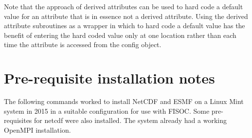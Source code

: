 \documentclass[12pt]{article}
\begin{document}
Note that the approach of derived attributes can be used to hard code a 
default value for an attribute that is in essence not a derived attribute. 
Using the derived attribute subroutines as a wrapper in which to hard 
code a default value has the benefit of entering the hard coded value 
only at one location rather than each time the attribute is accessed 
from the config object.






\clearpage

\appendix

\section{Pre-requisite installation notes}
\label{app:A}
The following commands worked to install NetCDF and ESMF on a Linux Mint system in 2015 
in a suitable configuration for use with FISOC. 
Some pre-requisites for netcdf were also installed.
The system already had a working OpenMPI installation.
\end{document}
